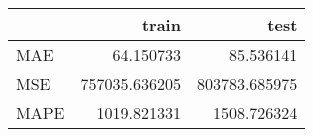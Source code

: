 \begin{tabular}{lrr}
\toprule
{} &          train &           test \\
\midrule
MAE  &      64.150733 &      85.536141 \\
MSE  &  757035.636205 &  803783.685975 \\
MAPE &    1019.821331 &    1508.726324 \\
\bottomrule
\end{tabular}
